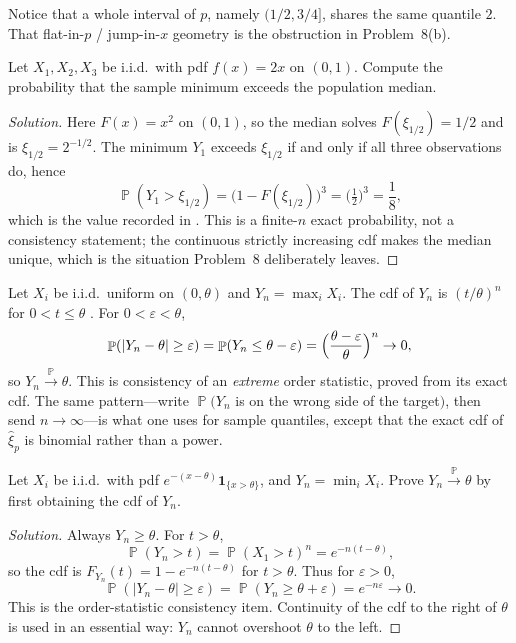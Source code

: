 \documentclass[11pt,a4paper]{article}
\DeclareMathOperator{\Pbb}{\mathbb{P}}
\begin{document}
Notice that a whole interval of \(p\), namely \((1/2,3/4]\), shares the same quantile \(2\). That flat-in-\(p\) / jump-in-\(x\) geometry is the obstruction in Problem~8(b).

\begin{exercise}
\label{ex:hogg-446a}
Let \(X_1,X_2,X_3\) be i.i.d.\ with pdf \(f(x)=2x\) on \((0,1)\). Compute the probability that the sample minimum exceeds the population median.
\end{exercise}

\begin{proof}[Solution]
Here \(F(x)=x^2\) on \((0,1)\), so the median solves \(F(\xi_{1/2})=1/2\) and is \(\xi_{1/2}=2^{-1/2}\). The minimum \(Y_1\) exceeds \(\xi_{1/2}\) if and only if all three observations do, hence
\[
\Pbb(Y_1>\xi_{1/2})
=
\bigl(1-F(\xi_{1/2})\bigr)^3
=
\bigl(\tfrac12\bigr)^3
=
\frac18,
\]
which is the value recorded in \citep[Appendix~F]{hogg2019}. This is a finite-\(n\) exact probability, not a consistency statement; the continuous strictly increasing cdf makes the median unique, which is the situation Problem~8 deliberately leaves.
\end{proof}

\begin{example}
\label{ex:hogg-512-uniform}
Let \(X_i\) be i.i.d.\ uniform on \((0,\theta)\) and \(Y_n=\max_i X_i\). The cdf of \(Y_n\) is \((t/\theta)^n\) for \(0<t\le\theta\) \citep[(5.1.1)]{hogg2019}. For \(0<\varepsilon<\theta\),
\[
\Pbb(|Y_n-\theta|\ge\varepsilon)
=
\Pbb(Y_n\le\theta-\varepsilon)
=
\Bigl(\frac{\theta-\varepsilon}{\theta}\Bigr)^n
\to 0,
\]
so \(Y_n\xrightarrow{\Pbb}\theta\). This is consistency of an \emph{extreme} order statistic, proved from its exact cdf. The same pattern---write \(\Pbb(Y_n\) is on the wrong side of the target\()\), then send \(n\to\infty\)---is what one uses for sample quantiles, except that the exact cdf of \(\hat{\xi}_p\) is binomial rather than a power.
\end{example}

\begin{exercise}
\label{ex:hogg-517}
Let \(X_i\) be i.i.d.\ with pdf \(e^{-(x-\theta)}\mathbf{1}_{\{x>\theta\}}\), and \(Y_n=\min_i X_i\). Prove \(Y_n\xrightarrow{\Pbb}\theta\) by first obtaining the cdf of \(Y_n\).
\end{exercise}

\begin{proof}[Solution]
Always \(Y_n\ge\theta\). For \(t>\theta\),
\[
\Pbb(Y_n>t)
=
\Pbb(X_1>t)^n
=
e^{-n(t-\theta)},
\]
so the cdf is \(F_{Y_n}(t)=1-e^{-n(t-\theta)}\) for \(t>\theta\). Thus for \(\varepsilon>0\),
\[
\Pbb(|Y_n-\theta|\ge\varepsilon)
=
\Pbb(Y_n\ge\theta+\varepsilon)
=
e^{-n\varepsilon}
\to 0.
\]
This is the order-statistic consistency item. Continuity of the cdf to the right of \(\theta\) is used in an essential way: \(Y_n\) cannot overshoot \(\theta\) to the left.
\end{proof}
\end{document}
